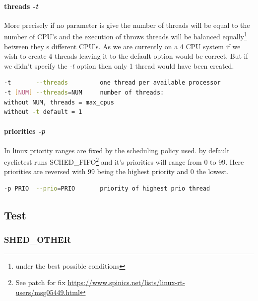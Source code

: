 \documentclass[10pt,a4paper]{article}
\begin{document}
\paragraph{threads \emph{-t}}
More precisely if no parameter is give the number of threads will be equal to the number of CPU's and the execution of throws threads will be balanced equally\footnote{under the best possible conditions} between they s different CPU's. As we are currently on a 4 CPU system if we wish to create 4 threads leaving it to the default option would be correct. But if we didn't specify the \emph{-t} option then only 1 thread would have been created.
\begin{lstlisting}[language=bash,caption={cyclictest -h}]
-t       --threads         one thread per available processor
-t [NUM] --threads=NUM     number of threads:
without NUM, threads = max_cpus
without -t default = 1
\end{lstlisting}
\paragraph{priorities \emph{-p}}
In linux priority ranges are fixed by the scheduling policy used. by default cyclictest runs SCHED\_FIFO\footnote{See patch for fix \url{https://www.spinics.net/lists/linux-rt-users/msg05449.html}} and it's priorities will range from 0 to 99. Here priorities are reversed with 99 being the highest priority and 0 the lowest.
\begin{lstlisting}[language=bash,caption={cyclictest -h}]
-p PRIO  --prio=PRIO       priority of highest prio thread
\end{lstlisting}
\subsection{Test}
\subsubsection{SHED\_OTHER}
\end{document}
